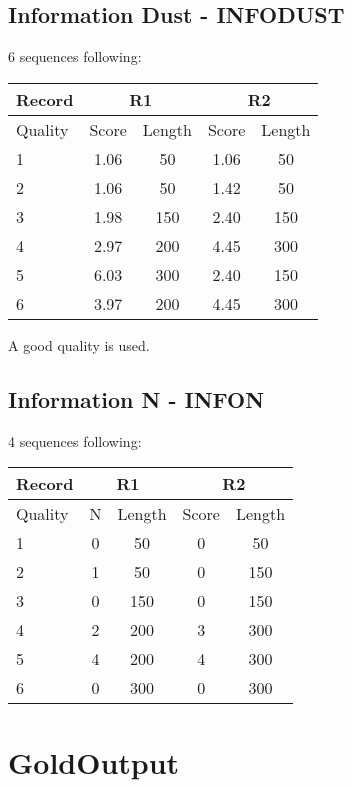 \documentclass{article}
\begin{document}
\subsection{Information Dust - INFODUST}
6 sequences following:
\begin{table}[H]
\begin{tabular}{|l|c|c|c|c|} \hline
    \textbf{Record} & \multicolumn{2}{c|}{R1} & \multicolumn{2}{c|}{R2} \\ \hline
    Quality & Score & Length & Score & Length\\ \hline
    1 & 1.06 & 50 & 1.06 & 50 \\ \hline
    2 & 1.06 & 50 & 1.42 & 50 \\ \hline
    3 & 1.98 & 150 & 2.40 & 150 \\ \hline
    4 & 2.97 & 200 & 4.45 & 300 \\ \hline
    5 & 6.03 & 300 & 2.40 & 150 \\ \hline
    6 & 3.97 & 200 & 4.45 & 300 \\ \hline
\end{tabular}
\end{table}
A good quality is used.

\subsection{Information N - INFON}
4 sequences following:
\begin{table}[H]
\begin{tabular}{|l|c|c|c|c|} \hline
    \textbf{Record} & \multicolumn{2}{c|}{R1} & \multicolumn{2}{c|}{R2} \\ \hline
    Quality & N & Length & Score & Length\\ \hline
    1 & 0 & 50 & 0 & 50 \\ \hline
    2 & 1 & 50 & 0 & 150 \\ \hline
    3 & 0 & 150 & 0 & 150 \\ \hline
    4 & 2 & 200 & 3 & 300 \\ \hline
    5 & 4 & 200 & 4 & 300 \\ \hline
    6 & 0 & 300 & 0 & 300 \\ \hline
\end{tabular}
\end{table}


\section{GoldOutput}
\end{document}
